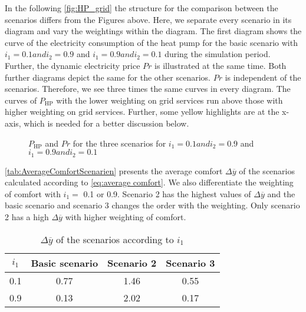 In the following \autoref{fig:HP_grid} the structure for the comparison between the scenarios differs from the Figures above. Here, we separate every scenario in its diagram and vary the weightings within the diagram. The first diagram shows the curve of the electricity consumption of the heat pump for the basic scenario with $i_\text{1} = 0.1 and i_\text{2} = 0.9$ and $i_\text{1} = 0.9 and i_\text{2} = 0.1$ during the simulation period. Further, the dynamic electricity price $Pr$ is illustrated at the same time. Both further diagrams depict the same for the other scenarios. $Pr$ is independent of the scenarios. Therefore, we see three times the same curves in every diagram. The curves of $P_\text{HP}$ with the lower weighting on grid services run above those with higher weighting on grid services. Further, some yellow highlights are at the x-axis, which is needed for a better discussion below. 
    \begin{figure}[H]
           \centering
        \def\svgwidth{0.9\textwidth}
        
        \caption{$P_\text{HP}$ and $Pr$ for the three scenarios for $i_\text{1} = 0.1 and i_\text{2} = 0.9$ and $i_\text{1} = 0.9 and i_\text{2} = 0.1$}
         \label{fig:HP_grid}
    \end{figure}
    
\autoref{tab:AverageComfortScenarien} presents the average comfort $\Delta \overline{y}$ of the scenarios calculated according to \autoref{eq:average comfort}. We also differentiate the weighting of comfort with $i_\text{1} =$ 0.1 or 0.9. Scenario 2 has the highest values of $\Delta \overline{y}$ and the basic scenario and scenario 3 changes the order with the weighting. Only scenario 2 has a high $\Delta \overline{y}$ with higher weighting of comfort.  
    \begin{table}[H]
        \centering
        \begin{tabular}{c||c|c|c}
          $i_\text{1}$  &  Basic scenario & Scenario 2 & Scenario 3\\
          \hline  \hline
             0.1 & 0.77 & 1.46 & 0.55\\
             0.9 & 0.13 & 2.02 & 0.17\\
        \end{tabular}
        \caption{$\Delta \overline{y}$ of the scenarios according to $i_\text{1}$}
        \label{tab:AverageComfortScenarien}
    \end{table}
    
